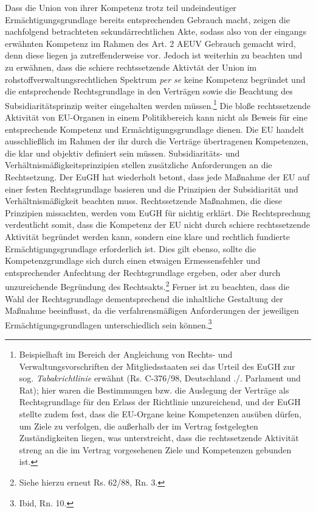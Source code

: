 \documentclass[12pt,a4paper,oneside]{book} %
\begin{document}
	Dass die Union von ihrer Kompetenz trotz teil undeindeutiger Ermächtigungsgrundlage bereits entsprechenden Gebrauch macht, zeigen die nachfolgend betrachteten sekundärrechtlichen Akte, sodass also von der eingangs erwähnten Kompetenz im Rahmen des Art. 2 AEUV Gebrauch gemacht wird, denn diese liegen ja zutreffenderweise vor. Jedoch ist weiterhin zu beachten und zu erwähnen, dass die schiere rechtssetzende Aktivtät der Union im rohstoffverwaltungsrechtlichen Spektrum \textit{per se} keine Kompetenz begründet und die entsprechende Rechtsgrundlage in den Verträgen sowie die Beachtung des Subsidiaritätsprinzip weiter eingehalten werden müssen.\footnote{Beispielhaft im Bereich der Angleichung von Rechts- und Verwaltungsvorschriften der Mitgliedsstaaten sei das Urteil des EuGH zur sog. \textit{Tabakrichtlinie} erwähnt (Rs. C-376/98, Deutschland ./. Parlament und Rat); hier waren die Bestimmungen bzw. die Auslegung der Verträge als Rechtsgrundlage für den Erlass der Richtlinie unzureichend, und der EuGH stellte zudem fest, dass die EU-Organe keine Kompetenzen ausüben dürfen, um Ziele zu verfolgen, die außerhalb der im Vertrag festgelegten Zuständigkeiten liegen, was unterstreicht, dass die rechtssetzende Aktivität streng an die im Vertrag vorgesehenen Ziele und Kompetenzen gebunden ist.} Die bloße rechtssetzende Aktivität von EU-Organen in einem Politikbereich kann nicht als Beweis für eine entsprechende Kompetenz und Ermächtigungsgrundlage dienen. Die EU handelt ausschließlich im Rahmen der ihr durch die Verträge übertragenen Kompetenzen, die klar und objektiv definiert sein müssen. Subsidiaritäts- und Verhältnismäßigkeitsprinzipien stellen zusätzliche Anforderungen an die Rechtsetzung. Der EuGH hat wiederholt betont, dass jede Maßnahme der EU auf einer festen Rechtsgrundlage basieren und die Prinzipien der Subsidiarität und Verhältnismäßigkeit beachten muss. Rechtssetzende Maßnahmen, die diese Prinzipien missachten, werden vom EuGH für nichtig erklärt. Die Rechtsprechung verdeutlicht somit, dass die Kompetenz der EU nicht durch schiere rechtssetzende Aktivität begründet werden kann, sondern eine klare und rechtlich fundierte Ermächtigungsgrundlage erforderlich ist. Dies gilt ebenso, sollte die Kompetenzgrundlage sich durch einen etwaigen Ermessensfehler und entsprechender Anfechtung der Rechtsgrundlage ergeben, oder aber durch unzureichende Begründung des Rechtsakts.\footnote{Siehe hierzu erneut Rs. 62/88, Rn. 3.} Ferner ist zu beachten, dass die Wahl der Rechtsgrundlage dementsprechend die inhaltliche Gestaltung der Maßnahme beeinflusst, da die verfahrensmäßigen Anforderungen der jeweiligen Ermächtigungsgrundlagen unterschiedlich sein können.\footnote{Ibid, Rn. 10.}
	
\end{document}
